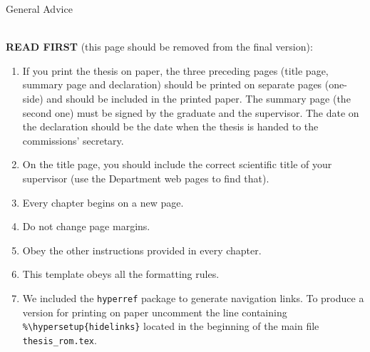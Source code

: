 \thispagestyle{empty}
\begin{center}\large
	General Advice
\end{center}
~\\

{\color{red}\large{\bf READ FIRST} (this page should be removed from the final version)}:\\
\begin{enumerate}
	\item	If you print the thesis on paper, the three preceding pages (title page, summary page and declaration) should be printed on separate pages (one-side) and should be included in the printed paper. The summary page (the second one) must be signed by the graduate and the supervisor. The date on the declaration should be the date when the thesis is handed to the commissions’ secretary.
	\item	On the title page, you should include the correct scientific title of your supervisor (use the Department web pages to find that).
	\item Every chapter begins on a new page.
	\item Do not change page margins.
	\item Obey the other instructions provided in every chapter.
	\item This template obeys all the formatting rules.
	\item We included the \verb+hyperref+ package to generate navigation links. To produce  a version for printing on paper uncomment the line containing \verb+%\hypersetup{hidelinks}+
	located in the beginning of the main file \verb+thesis_rom.tex+. 
\end{enumerate}

